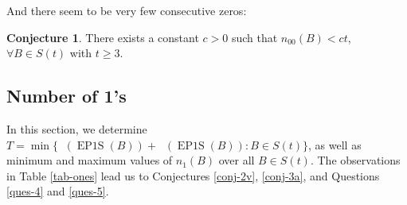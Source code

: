 \documentclass[final,3p,times]{elsarticle}
\theoremstyle{definition}
\newtheorem{conj}{Conjecture}[section]
\newcommand{\set}[1]{\{#1\}}
\DeclareMathOperator{\epos}{EP1S}
\DeclareMathOperator{\np}{\mathit{n}_p}
\DeclareMathOperator{\nv}{\mathit{n}_v}
\begin{document}
And there seem to be very few consecutive zeros:
\begin{conj}\label{conj-3}
There exists a constant $c > 0$ such that
$n_{00}(B) < ct$, $\forall{B}\in S(t)$ with $t\geq 3$.
\end{conj}




\subsection{Number of 1's}
\label{sec:num1}

In this section, we determine $T=\min\set{\np(\epos(B))+\nv(\epos(B)): B\in S(t)}$, as well as
minimum and maximum values of $n_1(B)$ over all $B\in S(t)$.
The observations in Table \ref{tab-ones} lead
us to Conjectures \ref{conj-2v}, \ref{conj-3a}, and Questions \ref{ques-4} and \ref{ques-5}.
\end{document}
